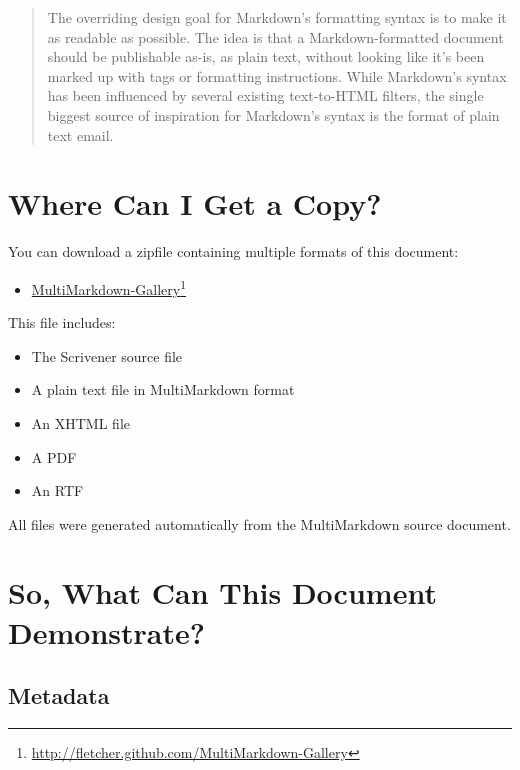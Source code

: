 \documentclass[oneside,article]{memoir}
\begin{document}
\begin{quotation}
The overriding design goal for Markdown's formatting syntax is to make it as
readable as possible. The idea is that a Markdown-formatted document should be
publishable as-is, as plain text, without looking like it's been marked up
with tags or formatting instructions. While Markdown's syntax has been
influenced by several existing text-to-HTML filters, the single biggest source
of inspiration for Markdown's syntax is the format of plain text
email.~\cite{Gruber}
\end{quotation}

\chapter{Where Can I Get a Copy?}
\label{wherecanigetacopy}

You can download a zipfile containing multiple formats of this document:


\begin{itemize}


\item \href{http://fletcher.github.com/MultiMarkdown-Gallery}{MultiMarkdown-Gallery}\footnote{\href{http://fletcher.github.com/MultiMarkdown-Gallery}{http://fletcher.github.com/MultiMarkdown-Gallery}}
\end{itemize}

This file includes:


\begin{itemize}


\item The Scrivener source file

\item A plain text file in MultiMarkdown format

\item An XHTML file

\item A PDF

\item An RTF
\end{itemize}

All files were generated automatically from the MultiMarkdown source document.


\chapter{So, What Can This Document Demonstrate?}
\label{sowhatcanthisdocumentdemonstrate}

\section{Metadata}
\label{metadata}
\end{document}
